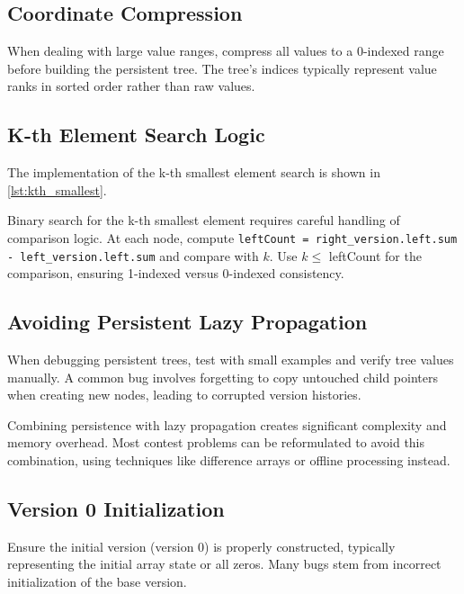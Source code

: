 \subsection{Coordinate Compression}

When dealing with large value ranges, compress all values to a 0-indexed range before building the persistent tree. The tree's indices typically represent value ranks in sorted order rather than raw values.

\subsection{K-th Element Search Logic}

\begin{marginnoteenv}[0pt]{The implementation of the k-th smallest element search is shown in \ref{lst:kth_smallest}.} \end{marginnoteenv}
Binary search for the k-th smallest element requires careful handling of comparison logic. At each node, compute \texttt{leftCount = right\_version.left.sum - left\_version.left.sum} and compare with $k$. Use $k \leq$ leftCount for the comparison, ensuring 1-indexed versus 0-indexed consistency.


\subsection{Avoiding Persistent Lazy Propagation}

\begin{marginnoteenv}[0pt]{When debugging persistent trees, test with small examples and verify tree values manually. A common bug involves forgetting to copy untouched child pointers when creating new nodes, leading to corrupted version histories.} \end{marginnoteenv}
Combining persistence with lazy propagation creates significant complexity and memory overhead. Most contest problems can be reformulated to avoid this combination, using techniques like difference arrays or offline processing instead.


\subsection{Version 0 Initialization}

Ensure the initial version (version 0) is properly constructed, typically representing the initial array state or all zeros. Many bugs stem from incorrect initialization of the base version.

